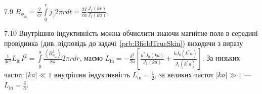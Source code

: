 \begin{Solution}{7.{9}}
    $B_{\phi_{\mathrm{in}}} = \frac{2}{cr} \int\limits_0^r j_z 2\pi r dt = \frac{2I}{ca} \frac{J_1(kr)}{J_1(ka)}$.
\end{Solution}
\begin{Solution}{7.{10}}
    Внутрішню індуктивність можна обчислити знаючи магнітне поле в середині провідника (див. відповідь до задачі~\ref{prb:BfieldTrueSkin})  виходячи з виразу $\frac{1}{4c^2}L_\mathrm{in}I^2 = \int\limits_0^a \frac{\left\langle  B_{\phi_{\mathrm{in}}}^2\right\rangle }{8\pi} 2\pi rdr$, маємо
    $L_\mathrm{in}  = -\frac{\delta^2}{2a}\left[ \frac{k^*J_0(ka)}{J_1(ka)} + \frac{kJ_0(k^*a)}{J_1(k^*a)}\right] $. За низьких частот $|ka| \ll 1$ внутрішня індуктивність  $L_\mathrm{in} = \frac12$, за великих частот $|ka| \gg 1$ --- $L_\mathrm{in} = \frac\delta a$.
\end{Solution}
